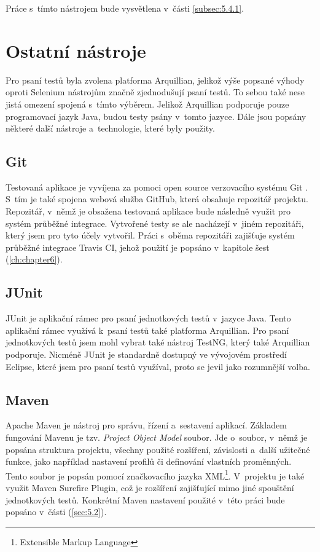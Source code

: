 \documentclass[
    color,   %
	table,   %
    twoside, %
    nolot, nolof,
]{fithesis3}
\begin{document}
Práce s~tímto nástrojem bude vysvětlena v~části \ref{subsec:5.4.1}.

\section{Ostatní nástroje}
Pro psaní testů byla zvolena platforma Arquillian, jelikož výše popsané výhody oproti Selenium nástrojům značně zjednodušují psaní testů. To sebou také nese jistá omezení spojená s~tímto výběrem. Jelikož Arquillian podporuje pouze programovací jazyk Java, budou testy psány v~tomto jazyce. Dále jsou popsány některé další nástroje a~technologie, které byly použity.
\subsection{Git}
Testovaná aplikace je vyvíjena za pomoci open source verzovacího systému Git \cite{Git}. S~tím je také spojena webová služba GitHub, která obsahuje repozitář projektu. Repozitář, v~němž je obsažena testovaná aplikace bude následně využit pro systém průběžné integrace. Vytvořené testy se ale nacházejí v~jiném repozitáři, který jsem pro tyto účely vytvořil. Práci s~oběma repozitáři zajišťuje systém průběžné integrace Travis CI, jehož použití je popsáno v~kapitole šest (\ref{ch:chapter6}).
\subsection{JUnit}
JUnit \cite{JUnit} je aplikační rámec pro psaní jednotkových testů v~jazyce Java. Tento aplikační rámec využívá k~psaní testů také platforma Arquillian. Pro psaní jednotkových testů jsem mohl vybrat také nástroj TestNG, který také Arquillian podporuje. Nicméně JUnit je standardně dostupný ve vývojovém prostředí Eclipse, které jsem pro psaní testů využíval, proto se jevil jako rozumnější volba.
\subsection{Maven}
\label{subsec:3.3.3}
Apache Maven \cite{Maven} je nástroj pro správu, řízení a~sestavení aplikací. Základem fungování Mavenu je tzv. \emph{Project Object Model} soubor. Jde o~soubor, v~němž je popsána struktura projektu, všechny použité rozšíření, závislosti a~další užitečné funkce, jako například nastavení profilů či definování vlastních proměnných. Tento soubor je popsán pomocí značkovacího jazyka XML\footnote{Extensible Markup Language}. V~projektu je také využit Maven Surefire Plugin, což je rozšíření zajišťující mimo jiné spouštění jednotkových testů. Konkrétní Maven nastavení použité v~této práci bude popsáno v~části (\ref{sec:5.2}).
\end{document}

